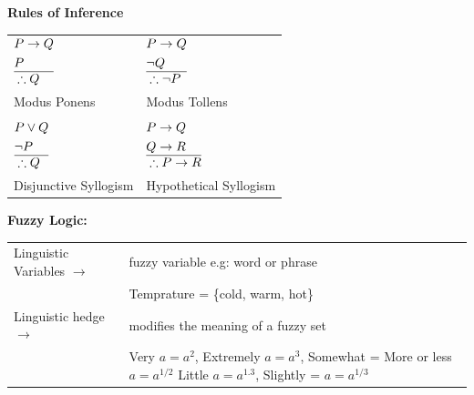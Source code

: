 \begin{multicols}{2}
\textbf{Rules of Inference}\\[0.5em]
\begin{tabularx}{0.4\textwidth}{LL}
   $\begin{aligned}
   & P \to Q \\
   & P \\\hline
   & \therefore Q \\
\end{aligned}$
&
$\begin{aligned}
   & P \to Q \\
   & \neg Q \\\hline
   & \therefore \neg P \\
\end{aligned}$\\
Modus Ponens
&
Modus Tollens
\\\\
$\begin{aligned}
   & P \lor Q \\
   & \neg P \\\hline
   & \therefore Q \\
\end{aligned}$
&
$\begin{aligned}
   & P \to Q \\
   & Q \to R \\\hline
   & \therefore P \to R \\
\end{aligned}$
\\
Disjunctive Syllogism
&
Hypothetical Syllogism
\end{tabularx}

\textbf{Fuzzy Logic:}\\[0.5em]
\begin{tabularx}{0.47\textwidth}{@{}l@{}X@{}}
   Linguistic Variables $\to$ \ &
   fuzzy variable e.g: word or phrase \\[-0.5em]
   & Temprature = \{cold, warm, hot\}\\

   Linguistic hedge $\to$ \ &
   modifies the meaning of a fuzzy set \\[-0.5em]
   & Very $a = a^2$, Extremely $a = a^3$, \newline
   Somewhat = More or less $a = a^{1/2}$ \newline
   Little $a = a^{1.3}$, Slightly = $a = a^{1/3}$ \\
\end{tabularx}


\end{multicols}
